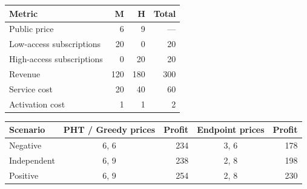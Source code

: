 \begin{tabular}{lrrr}
\toprule
Metric & M & H & Total \\
\midrule
Public price & 6 & 9 & --- \\
Low-access subscriptions & 20 & 0 & 20 \\
High-access subscriptions & 0 & 20 & 20 \\
Revenue & 120 & 180 & 300 \\
Service cost & 20 & 40 & 60 \\
Activation cost & 1 & 1 & 2 \\
\bottomrule
\end{tabular}

\begin{tabular}{lcrcr}
\toprule
Scenario & PHT / Greedy prices & Profit & Endpoint prices & Profit \\
\midrule
Negative & 6, 6 & 234 & 3, 6 & 178 \\
Independent & 6, 9 & 238 & 2, 8 & 198 \\
Positive & 6, 9 & 254 & 2, 8 & 230 \\
\bottomrule
\end{tabular}
